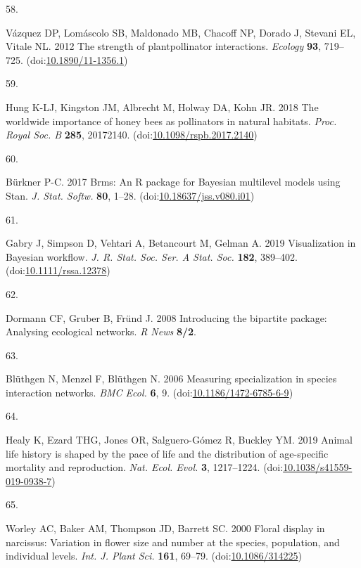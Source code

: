 \documentclass[
  12pt,
  a4paper,
]{article}
\newlength{\cslhangindent}
\newlength{\csllabelwidth}
\newlength{\cslentryspacingunit} %
\newenvironment{CSLReferences}[2] %
 {%
  \setlength{\parindent}{0pt}
  \ifodd #1
  \let\oldpar\par
  \def\par{\hangindent=\cslhangindent\oldpar}
  \fi
  \setlength{\parskip}{#2\cslentryspacingunit}
 }%
 {}
\newcommand{\CSLLeftMargin}[1]{\parbox[t]{\csllabelwidth}{#1}}
\newcommand{\CSLRightInline}[1]{\parbox[t]{\linewidth - \csllabelwidth}{#1}\break}
\begin{document}
\begin{CSLReferences}{0}{0}
\leavevmode{}%
\CSLLeftMargin{58. }
\CSLRightInline{Vázquez DP, Lomáscolo SB, Maldonado MB, Chacoff NP, Dorado J, Stevani EL, Vitale NL. 2012 The strength of plant\textendash pollinator interactions. \emph{Ecology} \textbf{93}, 719--725. (doi:\href{https://doi.org/10.1890/11-1356.1}{10.1890/11-1356.1})}

\leavevmode{}%
\CSLLeftMargin{59. }
\CSLRightInline{Hung K-LJ, Kingston JM, Albrecht M, Holway DA, Kohn JR. 2018 The worldwide importance of honey bees as pollinators in natural habitats. \emph{Proc. Royal Soc. B} \textbf{285}, 20172140. (doi:\href{https://doi.org/10.1098/rspb.2017.2140}{10.1098/rspb.2017.2140})}

\leavevmode{}%
\CSLLeftMargin{60. }
\CSLRightInline{Bürkner P-C. 2017 Brms: {An R} package for {Bayesian} multilevel models using {Stan}. \emph{J. Stat. Softw.} \textbf{80}, 1--28. (doi:\href{https://doi.org/10.18637/jss.v080.i01}{10.18637/jss.v080.i01})}

\leavevmode{}%
\CSLLeftMargin{61. }
\CSLRightInline{Gabry J, Simpson D, Vehtari A, Betancourt M, Gelman A. 2019 Visualization in {Bayesian} workflow. \emph{J. R. Stat. Soc. Ser. A Stat. Soc.} \textbf{182}, 389--402. (doi:\href{https://doi.org/10.1111/rssa.12378}{10.1111/rssa.12378})}

\leavevmode{}%
\CSLLeftMargin{62. }
\CSLRightInline{Dormann CF, Gruber B, Fründ J. 2008 Introducing the bipartite package: Analysing ecological networks. \emph{R News} \textbf{8/2}.}

\leavevmode{}%
\CSLLeftMargin{63. }
\CSLRightInline{Blüthgen N, Menzel F, Blüthgen N. 2006 Measuring specialization in species interaction networks. \emph{BMC Ecol.} \textbf{6}, 9. (doi:\href{https://doi.org/10.1186/1472-6785-6-9}{10.1186/1472-6785-6-9})}

\leavevmode{}%
\CSLLeftMargin{64. }
\CSLRightInline{Healy K, Ezard THG, Jones OR, Salguero-Gómez R, Buckley YM. 2019 Animal life history is shaped by the pace of life and the distribution of age-specific mortality and reproduction. \emph{Nat. Ecol. Evol.} \textbf{3}, 1217--1224. (doi:\href{https://doi.org/10.1038/s41559-019-0938-7}{10.1038/s41559-019-0938-7})}

\leavevmode{}%
\CSLLeftMargin{65. }
\CSLRightInline{Worley AC, Baker AM, Thompson JD, Barrett SC. 2000 Floral display in narcissus: Variation in flower size and number at the species, population, and individual levels. \emph{Int. J. Plant Sci.} \textbf{161}, 69--79. (doi:\href{https://doi.org/10.1086/314225}{10.1086/314225})}


\end{CSLReferences}
\end{document}
